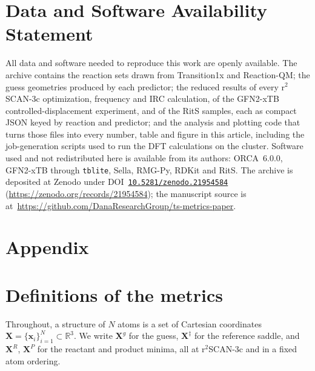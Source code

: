 \documentclass[11pt]{article}
\begin{document}
\section*{Data and Software Availability Statement}
\begin{sloppypar}
All data and software needed to reproduce this work are openly available. The
archive contains the reaction sets drawn from Transition1x and Reaction-QM; the
guess geometries produced by each predictor; the reduced results of every
r$^2$SCAN-3c optimization, frequency and IRC calculation, of the GFN2-xTB
controlled-displacement experiment, and of the RitS samples, each as compact JSON
keyed by reaction and predictor; and the analysis and plotting code that turns
those files into every number, table and figure in this article, including the
job-generation scripts used to run the DFT calculations on the cluster. Software
used and not redistributed here is available from its authors: ORCA~6.0.0,
GFN2-xTB through \texttt{tblite}, Sella, RMG-Py, RDKit and RitS. The archive is
deposited at Zenodo under DOI~\href{https://doi.org/10.5281/zenodo.21954584}
{\nolinkurl{10.5281/zenodo.21954584}}
(\url{https://zenodo.org/records/21954584}); the manuscript source is
at~\url{https://github.com/DanaResearchGroup/ts-metrics-paper}.
\end{sloppypar}

\appendix

\section*{Appendix}

\section{Definitions of the metrics}
\label{app:metrics}

Throughout, a structure of $N$ atoms is a set of Cartesian coordinates
$\mathbf{X}=\{\mathbf{x}_i\}_{i=1}^{N}\subset\mathbb{R}^{3}$. We write
$\mathbf{X}^{g}$ for the guess, $\mathbf{X}^{\ddagger}$ for the reference saddle,
and $\mathbf{X}^{R}$, $\mathbf{X}^{P}$ for the reactant and product minima, all at
r$^2$SCAN-3c and in a fixed atom ordering.
\end{document}
